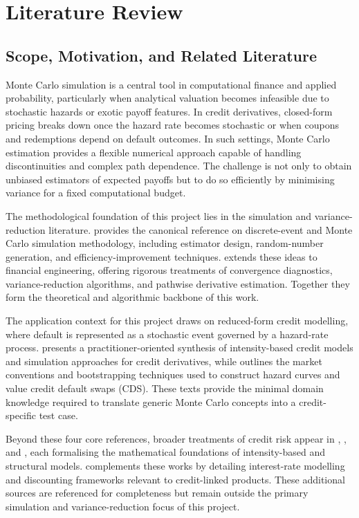 \section{Literature Review}

\subsection{Scope, Motivation, and Related Literature}

Monte Carlo simulation is a central tool in computational finance and applied probability, particularly when analytical valuation becomes infeasible due to stochastic hazards or exotic payoff features. In credit derivatives, closed-form pricing breaks down once the hazard rate becomes stochastic or when coupons and redemptions depend on default outcomes. In such settings, Monte Carlo estimation provides a flexible numerical approach capable of handling discontinuities and complex path dependence. The challenge is not only to obtain unbiased estimators of expected payoffs but to do so efficiently by minimising variance for a fixed computational budget.

The methodological foundation of this project lies in the simulation and variance-reduction literature. \citet{lawKelton2015} provides the canonical reference on discrete-event and Monte Carlo simulation methodology, including estimator design, random-number generation, and efficiency-improvement techniques. \citet{glasserman2004} extends these ideas to financial engineering, offering rigorous treatments of convergence diagnostics, variance-reduction algorithms, and pathwise derivative estimation. Together they form the theoretical and algorithmic backbone of this work. 

The application context for this project draws on reduced-form credit modelling, where default is represented as a stochastic event governed by a hazard-rate process. \citet{schonbucher2003} presents a practitioner-oriented synthesis of intensity-based credit models and simulation approaches for credit derivatives, while \citet{okaneTurnbull2003} outlines the market conventions and bootstrapping techniques used to construct hazard curves and value credit default swaps (CDS). These texts provide the minimal domain knowledge required to translate generic Monte Carlo concepts into a credit-specific test case.

Beyond these four core references, broader treatments of credit risk appear in \citet{duffieSingleton2003}, \citet{lando2004}, and \citet{bieleckiRutkowski2002}, each formalising the mathematical foundations of intensity-based and structural models. \citet{brigoMercurio2006} complements these works by detailing interest-rate modelling and discounting frameworks relevant to credit-linked products. These additional sources are referenced for completeness but remain outside the primary simulation and variance-reduction focus of this project.

